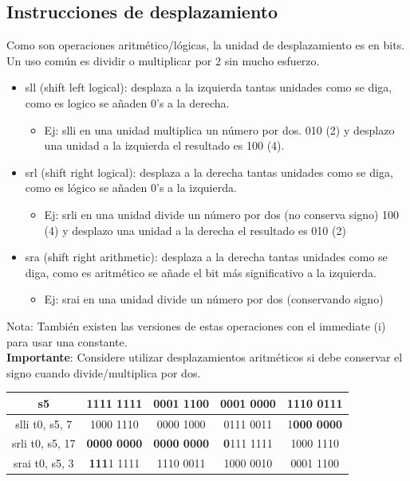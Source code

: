 \documentclass[10pt,a4paper]{article}
\begin{document}
\subsection*{Instrucciones de desplazamiento}
Como son operaciones aritmético/lógicas, la unidad de desplazamiento es en bits. Un uso común es dividir o multiplicar por 2 sin mucho esfuerzo.
\begin{itemize}
    \item sll (shift left logical): desplaza a la izquierda tantas unidades como se diga, como es logico se añaden 0's a la derecha.
    \begin{itemize}
        \item Ej: slli en una unidad multiplica un número por dos. 
        010 (2) y desplazo una unidad a la izquierda el resultado es 100 (4).
    \end{itemize}
    \item srl (shift right logical): desplaza a la derecha tantas unidades como se diga, como es lógico se añaden 0's a la izquierda.
    \begin{itemize}
        \item Ej: srli en una unidad divide un número por dos (no conserva signo)
        100 (4) y desplazo una unidad a la derecha el resultado es 010 (2)
    \end{itemize}
    \item sra (shift right arithmetic): desplaza a la derecha tantas unidades como se diga, como es aritmético se añade el bit más significativo a la izquierda.
    \begin{itemize}
        \item Ej: srai en una unidad divide un número por dos (conservando signo)
    \end{itemize}
\end{itemize}
Nota: También existen las versiones de estas operaciones con el immediate (i) para usar una constante. \\
\textbf{Importante}: Considere utilizar desplazamientos aritméticos si debe conservar el signo cuando divide/multiplica por dos.
\begin{table}[h!]
    \centering
    \begin{tabular}{|c | c | c | c| c|}
    \hline
    s5 & 1111 1111 & 0001 1100 & 0001 0000 & 1110 0111 \\ \hline
    slli t0, s5, 7 & 1000 1110 & 0000 1000 & 0111 0011 & 1\textbf{000 0000} \\ \hline
    srli t0, s5, 17 & \textbf{0000 0000} & \textbf{0000 0000} & \textbf{0}111 1111 & 1000 1110\\ \hline
    srai t0, s5, 3 & \textbf{111}1 1111 & 1110 0011 & 1000 0010 & 0001 1100\\ \hline
    \end{tabular}
    \label{tab:desplazamiento_riscv}
\end{table} 
\end{document}
